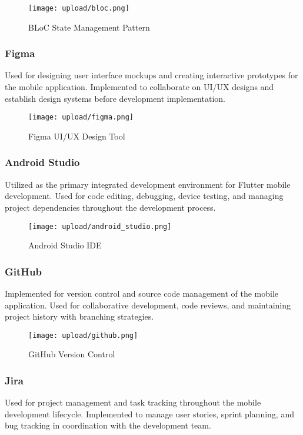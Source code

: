 \documentclass[12pt,a4paper]{report}
\begin{document}
\begin{figure}[H]
    \centering
    \texttt{[image: upload/bloc.png]}
    \caption{BLoC State Management Pattern}
    \label{fig:bloc}
\end{figure}

\subsubsection{Figma}
Used for designing user interface mockups and creating interactive prototypes for the mobile application. Implemented to collaborate on UI/UX designs and establish design systems before development implementation.

\begin{figure}[H]
    \centering
    \texttt{[image: upload/figma.png]}
    \caption{Figma UI/UX Design Tool}
    \label{fig:figma}
\end{figure}

\subsubsection{Android Studio}
Utilized as the primary integrated development environment for Flutter mobile development. Used for code editing, debugging, device testing, and managing project dependencies throughout the development process.

\begin{figure}[H]
    \centering
    \texttt{[image: upload/android\_studio.png]}
    \caption{Android Studio IDE}
    \label{fig:android_studio}
\end{figure}

\subsubsection{GitHub}
Implemented for version control and source code management of the mobile application. Used for collaborative development, code reviews, and maintaining project history with branching strategies.

\begin{figure}[H]
    \centering
    \texttt{[image: upload/github.png]}
    \caption{GitHub Version Control}
    \label{fig:github}
\end{figure}

\subsubsection{Jira}
Used for project management and task tracking throughout the mobile development lifecycle. Implemented to manage user stories, sprint planning, and bug tracking in coordination with the development team.
\end{document}
